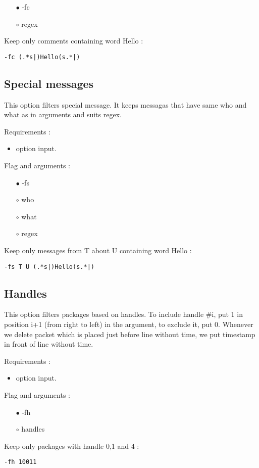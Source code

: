 \documentclass[english]{article}
\begin{document}
\begin{itemize}
\item[$\bullet$] -fc
\item[$\circ$] regex
\end{itemize}
Keep only comments containing word Hello : 
\begin{lstlisting} 
-fc (.*s|)Hello(s.*|)
\end{lstlisting}


\subsection{Special messages}
This option filters special message. It keeps messagas that have same who and what as in arguments and suits regex.  

\noindent Requirements : 
\begin{itemize}
\item option input. 
\end{itemize}
Flag and arguments :
\begin{itemize}
\item[$\bullet$] -fs
\item[$\circ$] who
\item[$\circ$] what
\item[$\circ$] regex
\end{itemize}
Keep only messages from T about U containing word Hello : 
\begin{lstlisting} 
-fs T U (.*s|)Hello(s.*|)
\end{lstlisting}


\subsection{Handles}
This option filters packages based on handles. To include handle \#i, put 1 in position i+1 (from right to left) in the argument, to exclude it, put 0. Whenever we delete packet which is placed just before line without time, we put timestamp in front of line without time.

\noindent Requirements : 
\begin{itemize}
\item option input. 
\end{itemize}
Flag and arguments :
\begin{itemize}
\item[$\bullet$] -fh
\item[$\circ$] handles
\end{itemize}
Keep only packages with handle 0,1 and 4 : 
\begin{lstlisting} 
-fh 10011
\end{lstlisting}
\end{document}
